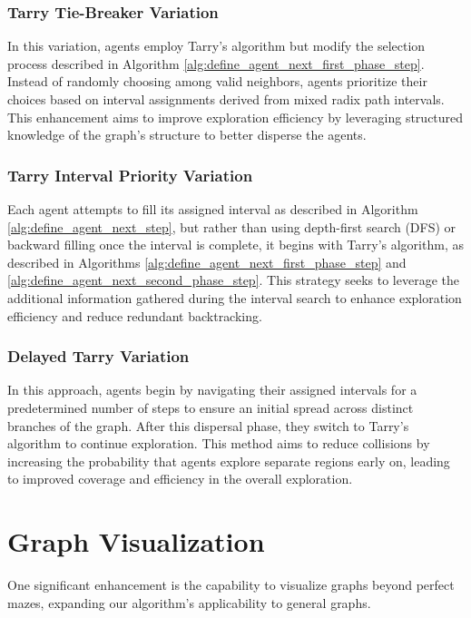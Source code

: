 \subsubsection{Tarry Tie-Breaker Variation}

In this variation, agents employ Tarry's algorithm but modify the selection process described in Algorithm \ref{alg:define_agent_next_first_phase_step}. Instead of randomly choosing among valid neighbors, agents prioritize their choices based on interval assignments derived from mixed radix path intervals. This enhancement aims to improve exploration efficiency by leveraging structured knowledge of the graph's structure to better disperse the agents.

\subsubsection{Tarry Interval Priority Variation}

Each agent attempts to fill its assigned interval as described in Algorithm \ref{alg:define_agent_next_step}, but rather than using depth-first search (DFS) or backward filling once the interval is complete, it begins with Tarry's algorithm, as described in Algorithms \ref{alg:define_agent_next_first_phase_step} and \ref{alg:define_agent_next_second_phase_step}. This strategy seeks to leverage the additional information gathered during the interval search to enhance exploration efficiency and reduce redundant backtracking.

\subsubsection{Delayed Tarry Variation}

In this approach, agents begin by navigating their assigned intervals for a predetermined number of steps to ensure an initial spread across distinct branches of the graph. After this dispersal phase, they switch to Tarry's algorithm to continue exploration. This method aims to reduce collisions by increasing the probability that agents explore separate regions early on, leading to improved coverage and efficiency in the overall exploration.

\section{Graph Visualization}
\label{section_method_graph_visualization}

One significant enhancement is the capability to visualize graphs
beyond perfect mazes, expanding our algorithm's applicability to general graphs.

